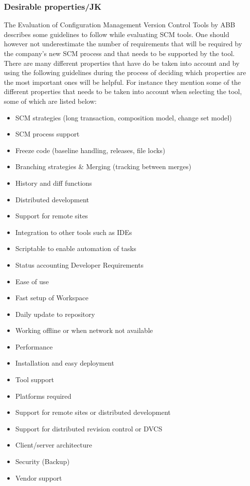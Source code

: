 \documentclass[10pt]{article}
\begin{document}
\subsubsection{Desirable properties/JK}
The Evaluation of Configuration Management Version Control Tools by ABB describes some guidelines to follow while evaluating SCM tools.
One should however not underestimate the number of requirements that will be required by the company's new SCM process and that needs to be supported by the tool.
There are many different properties that have do be taken into account and by using the following guidelines during the process of deciding which properties are the most important ones will be helpful. For instance they mention some of the different properties that needs to be taken into account when selecting the tool, some of which are listed below:
\begin{itemize}
\item SCM strategies (long transaction, composition model, change set model)
\item SCM process support
\item Freeze code (baseline handling, releases, file locks)
\item Branching strategies \& Merging (tracking between merges)
\item History and diff functions
\item Distributed development
\item Support for remote sites
\item Integration to other tools such as IDEs
\item Scriptable to enable automation of tasks
\item Status accounting Developer Requirements
\item Ease of use
\item Fast setup of Workspace
\item Daily update to repository
\item Working offline or when network not available
\item Performance
\item Installation and easy deployment
\item Tool support
\item Platforms required
\item Support for remote sites or distributed development
\item Support for distributed revision control or DVCS
\item Client/server architecture
\item Security (Backup)
\item Vendor support
\end{itemize}
\end{document}
